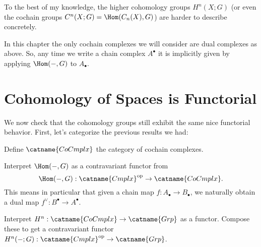 To the best of my knowledge, the higher cohomology groups $H^n(X; G)$
(or even the cochain groups $C^n(X; G) = \Hom(C_n(X), G)$) are harder to describe concretely.

\begin{abuse}
	In this chapter the only cochain complexes
	we will consider are dual complexes as above.
	So, any time we write a chain complex $A^\bullet$ it is implicitly given
	by applying $\Hom(-,G)$ to $A_\bullet$.
\end{abuse}

\section{Cohomology of Spaces is Functorial}
We now check that the cohomology groups still exhibit the same nice functorial behavior.
First, let's categorize the previous results we had:

\begin{ques}
	Define $\catname{CoCmplx}$
	the category of cochain complexes.
\end{ques}

\begin{exercise}
	Interpret $\Hom(-,G)$ as a contravariant functor
	from \[ \Hom(-,G) : \catname{Cmplx}\op \to \catname{CoCmplx}. \]
	This means in particular that given a chain map $f : A_\bullet \to B_\bullet$,
	we naturally obtain a dual map $f^\vee : B^\bullet \to A^\bullet$.
\end{exercise}

\begin{ques}
	Interpret $H^n : \catname{CoCmplx} \to \catname{Grp}$ as a functor.
	Compose these to get a contravariant functor
	$H^n(-;G) : \catname{Cmplx}\op \to \catname{Grp}$.
\end{ques}

